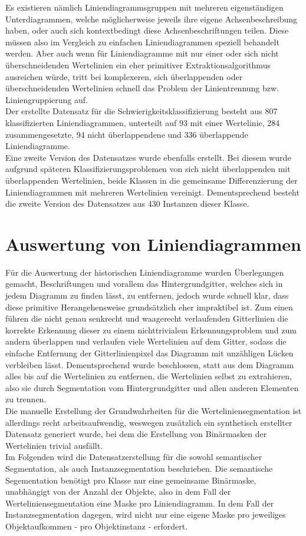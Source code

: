 Es existieren nämlich Liniendiagrammsgruppen mit mehreren eigenständigen Unterdiagrammen, welche möglicherweise jeweils ihre eigene Achsenbeschreibung haben, oder auch sich kontextbedingt diese Achsenbeschriftungen teilen. Diese müssen also im Vergleich zu einfachen Liniendiagrammen speziell behandelt werden. Aber auch wenn für Liniendiagramme mit nur einer oder sich nicht überschneidenden Wertelinien ein eher primitiver Extraktionsalgorithmus ausreichen würde, tritt bei komplexeren, sich überlappenden oder überschneidenden Wertelinien schnell das Problem der Linientrennung bzw. Liniengruppierung auf.
\\
Der erstellte Datensatz für die Schwierigkeitsklassifizierung besteht aus 807 klassifizierten Liniendiagrammen, unterteilt auf 93 mit einer Wertelinie, 284 zusammengesetzte, 94 nicht überlappendene und 336 überlappende Liniendiagramme.
\\
Eine zweite Version des Datensatzes wurde ebenfalls erstellt. Bei diesem wurde aufgrund späteren Klassifizierungsproblemen von sich nicht überlappenden mit überlappenden Wertelinien, beide Klassen in die gemeinsame Differenzierung der Liniendiagrammen mit mehreren Wertelinien vereinigt. Dementsprechend besteht die zweite Version des Datensatzes aus 430 Instanzen dieser Klasse.

\section{Auswertung von Liniendiagrammen}

Für die Auswertung der historischen Liniendiagramme wurden Überlegungen gemacht, Beschriftungen und vorallem das Hintergrundgitter, welches sich in jedem Diagramm zu finden lässt, zu entfernen, jedoch wurde schnell klar, dass diese primitive Herangehensweise grundsätzlich eher impraktibel ist. Zum einen führen die nicht genau senkrecht und waagerecht verlaufenden Gitterlinien die korrekte Erkennung dieser zu einem nichttrivialem Erkennungsproblem und zum andern überlappen und verlaufen viele Wertelinien auf dem Gitter, sodass die einfache Entfernung der Gitterlinienpixel das Diagramm mit unzähligen Lücken verbleiben lässt. Dementsprechend wurde beschlossen, statt aus dem Diagramm alles bis auf die Wertelinien zu entfernen, die Wertelinien selbst zu extrahieren, also sie durch Segmentation vom Hintergrundgitter und allen anderen Elementen zu trennen.
\\
Die manuelle Erstellung der Grundwahrheiten für die Werteliniensegmentation ist allerdings recht arbeitsaufwendig, weswegen zusätzlich ein synthetisch erstellter Datensatz generiert wurde, bei dem die Erstellung von Binärmasken der Wertelinien trivial ausfällt.
\\
Im Folgenden wird die Datensatzerstellung für die sowohl semantischer Segmentation, als auch Instanzsegmentation beschrieben. Die semantische Segementation benötigt pro Klasse nur eine gemeinsame Binärmaske, unabhängigt von der Anzahl der Objekte, also in dem Fall der Werteliniensegmentation eine Maske pro Liniendiagramm. In dem Fall der Instanzsegmentation dagegen, wird nicht nur eine eigene Maske pro jeweiliges Objektaufkommen - pro Objektinstanz - erfordert.

